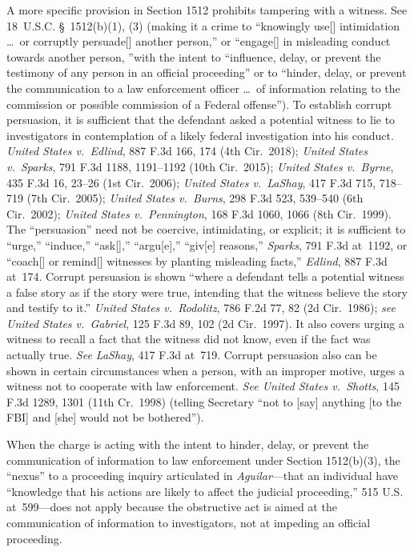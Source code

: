 A more specific provision in Section 1512 prohibits tampering with a witness.
See 18~U.S.C. \S~1512(b)(1), (3) (making it a crime to ``knowingly use[] intimidation \dots\ or corruptly persuade[] another person,'' or ``engage[] in misleading conduct towards another person, ''with the intent to ``influence, delay, or prevent the testimony of any person in an official proceeding'' or to ``hinder, delay, or prevent the communication to a law enforcement officer \dots\ of information relating to the commission or possible commission of a Federal offense'').
To establish corrupt persuasion, it is sufficient that the defendant asked a potential witness to lie to investigators in contemplation of a likely federal investigation into his conduct.
\textit{United States v.\ Edlind}, 887 F.3d 166, 174 (4th Cir.~2018);
\textit{United States v.\ Sparks}, 791 F.3d 1188, 1191--1192 (10th Cir.~2015);
\textit{United States v.\ Byrne}, 435 F.3d 16, 23--26 (1st Cir.~2006);
\textit{United States v.\ LaShay}, 417 F.3d 715, 718--719 (7th Cir.~2005);
\textit{United States v.\ Burns}, 298 F.3d 523, 539--540 (6th Cir.~2002);
\textit{United States v.\ Pennington}, 168 F.3d 1060, 1066 (8th Cir.~1999).
The ``persuasion'' need not be coercive, intimidating, or explicit;
it is sufficient to ``urge,'' ``induce,'' ``ask[],'' ``argu[e],'' ``giv[e] reasons,''
\textit{Sparks}, 791 F.3d at~1192, or ``coach[] or remind[] witnesses by planting misleading facts,''
\textit{Edlind}, 887 F.3d at~174.
Corrupt persuasion is shown ``where a defendant tells a potential witness a false story as if the story were true, intending that the witness believe the story and testify to it.''
\textit{United States v.\ Rodolitz}, 786 F.2d 77, 82 (2d Cir.~1986);
\textit{see United States v.\ Gabriel}, 125 F.3d 89, 102 (2d Cir.~1997).
It also covers urging a witness to recall a fact that the witness did not know, even if the fact was actually true.
\textit{See LaShay}, 417 F.3d at~719.
Corrupt persuasion also can be shown in certain circumstances when a person, with an improper motive, urges a witness not to cooperate with law enforcement.
\textit{See United States v.\ Shotts}, 145 F.3d 1289, 1301 (11th Cr.~1998) (telling Secretary ``not to [say] anything [to the FBI] and [she] would not be bothered'').

When the charge is acting with the intent to hinder, delay, or prevent the communication of information to law enforcement under Section 1512(b)(3), the ``nexus'' to a proceeding inquiry articulated in \textit{Aguilar}---that an individual have ``knowledge that his actions are likely to affect the judicial proceeding,'' 515 U.S. at~599---does not apply because the obstructive act is aimed at the communication of information to investigators, not at impeding an official proceeding.


